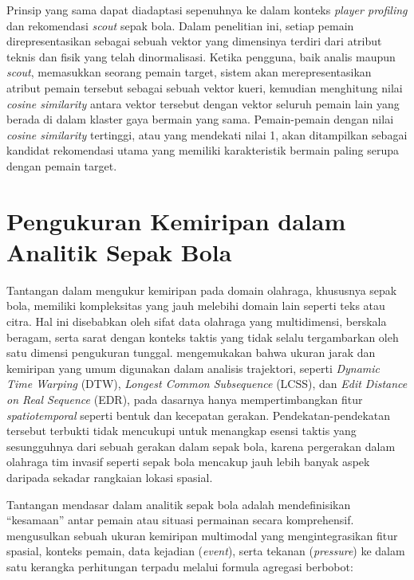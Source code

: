 Prinsip yang sama dapat diadaptasi sepenuhnya ke dalam konteks \emph{player profiling} dan rekomendasi \emph{scout} sepak bola. Dalam penelitian ini, setiap pemain direpresentasikan sebagai sebuah vektor yang dimensinya terdiri dari atribut teknis dan fisik yang telah dinormalisasi. Ketika pengguna, baik analis maupun \emph{scout}, memasukkan seorang pemain target, sistem akan merepresentasikan atribut pemain tersebut sebagai sebuah vektor kueri, kemudian menghitung nilai \emph{cosine similarity} antara vektor tersebut dengan vektor seluruh pemain lain yang berada di dalam klaster gaya bermain yang sama. Pemain-pemain dengan nilai \emph{cosine similarity} tertinggi, atau yang mendekati nilai 1, akan ditampilkan sebagai kandidat rekomendasi utama yang memiliki karakteristik bermain paling serupa dengan pemain target.

\section{Pengukuran Kemiripan dalam Analitik Sepak Bola}
\label{sec:kemiripan-analitik}

Tantangan dalam mengukur kemiripan pada domain olahraga, khususnya sepak bola, memiliki kompleksitas yang jauh melebihi domain lain seperti teks atau citra. Hal ini disebabkan oleh sifat data olahraga yang multidimensi, berskala beragam, serta sarat dengan konteks taktis yang tidak selalu tergambarkan oleh satu dimensi pengukuran tunggal. \textcite{stein2019} mengemukakan bahwa ukuran jarak dan kemiripan yang umum digunakan dalam analisis trajektori, seperti \emph{Dynamic Time Warping} (DTW), \emph{Longest Common Subsequence} (LCSS), dan \emph{Edit Distance on Real Sequence} (EDR), pada dasarnya hanya mempertimbangkan fitur \emph{spatiotemporal} seperti bentuk dan kecepatan gerakan. Pendekatan-pendekatan tersebut terbukti tidak mencukupi untuk menangkap esensi taktis yang sesungguhnya dari sebuah gerakan dalam sepak bola, karena pergerakan dalam olahraga tim invasif seperti sepak bola mencakup jauh lebih banyak aspek daripada sekadar rangkaian lokasi spasial.

Tantangan mendasar dalam analitik sepak bola adalah mendefinisikan ``kesamaan'' antar pemain atau situasi permainan secara komprehensif. \textcite{stein2019} mengusulkan sebuah ukuran kemiripan multimodal yang mengintegrasikan fitur spasial, konteks pemain, data kejadian (\emph{event}), serta tekanan (\emph{pressure}) ke dalam satu kerangka perhitungan terpadu melalui formula agregasi berbobot:


